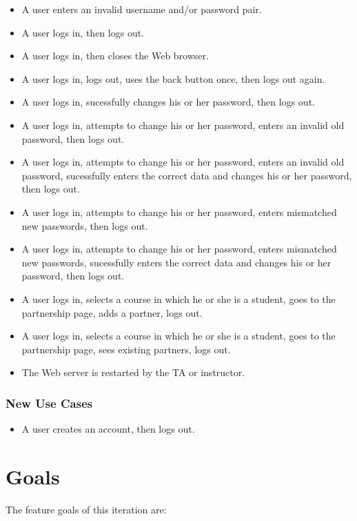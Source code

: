 \documentclass[a4paper]{article}
\begin{document}
\begin{itemize}
\item{A user enters an invalid username and/or password pair.}
\item{A user logs in, then logs out.}
\item{A user logs in, then closes the Web browser.}
\item{A user logs in, logs out, uses the back button once, then logs out again.}
\item{A user logs in, sucessfully changes his or her password, then logs out.}
\item{A user logs in, attempts to change his or her password, enters an invalid
old password, then logs out.}
\item{A user logs in, attempts to change his or her password, enters an invalid
old password, sucessfully enters the correct data and changes his or her password,
then logs out.}
\item{A user logs in, attempts to change his or her password, enters mismatched
new passwords, then logs out.}
\item{A user logs in, attempts to change his or her password, enters mismatched
new passwords, sucessfully enters the correct data and changes his or her password,
then logs out.}
\item{A user logs in, selects a course in which he or she is a student, goes to
  the partnership page, adds a partner, logs out.}
\item{A user logs in, selects a course in which he or she is a student, goes to
  the partnership page, sees existing partners, logs out.}
\item{The Web server is restarted by the TA or instructor.}
\end{itemize}

\subsubsection{New Use Cases}\label{subsubsec:newusecases}
\begin{itemize}
\item{A user creates an account, then logs out.}
\end{itemize}

\section{Goals}\label{sec:goals}

The feature goals of this iteration are:
\end{document}
